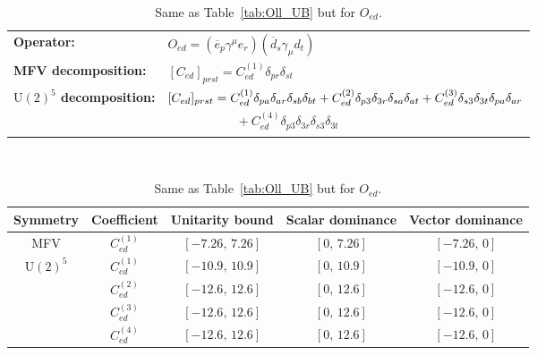 \begin{table}[tbp]
\centering
{\small
\begin{tabular}{ll}
    \textbf{Operator:} &
        $\boxed{O_{ed} = (\overline e_p \gamma^\mu e_r)(\overline d_s \gamma_\mu d_t)}$ \\[0.2cm]
    \textbf{MFV decomposition:} &
        $[C_{ed}]_{prst} =
            C_{ed}^{(1)}\delta_{pr}\delta_{st}$ \\[0.15cm]
    \textbf{$\mathrm{U}(2)^5$ decomposition:} &
        $[C_{ed}]_{prst} =
            C_{ed}^{(1)}\Pij{p}{r}{a}\Pij{s}{t}{b}
            + C_{ed}^{(2)}\delta_{p3}\delta_{3r}\Pij{s}{t}{a} + C_{ed}^{(3)}\delta_{s3}\delta_{3t}\Pij{p}{r}{a}
            $ \\
        & $\phantom{[C_{ed}]_{prst} ={}}+ C_{ed}^{(4)}\delta_{p3}\delta_{3r}\delta_{s3}\delta_{3t}$ \\
\end{tabular}
\\[0.3cm]
\renewcommand{\arraystretch}{1.3}
\begin{tabular}{ccccc}
    \toprule
    \rowcolor{hdrcolor}
    \textbf{Symmetry} & \textbf{Coefficient}
        & \textbf{Unitarity bound}
        & \textbf{Scalar dominance}
        & \textbf{Vector dominance} \\
    \midrule
    \multirow{1}{*}{MFV}
        & $C_{ed}^{(1)}$ & $[-7.26,\, 7.26]$  & $[0,\, 7.26]$      & $[-7.26,\, 0]$    \\
    \midrule
    \multirow{4}{*}{$\mathrm{U}(2)^5$}
        & $C_{ed}^{(1)}$ & $[-10.9,\, 10.9]$  & $[0,\, 10.9]$      & $[-10.9,\, 0]$    \\
        & $C_{ed}^{(2)}$ & $[-12.6,\, 12.6]$  & $[0,\, 12.6]$  & $[-12.6,\, 0]$ \\
        & $C_{ed}^{(3)}$ & $[-12.6,\, 12.6]$  & $[0,\, 12.6]$  & $[-12.6,\, 0]$ \\
        & $C_{ed}^{(4)}$ & $[-12.6,\, 12.6]$  & $[0,\, 12.6]$  & $[-12.6,\, 0]$ \\
    \bottomrule
\end{tabular}}
\caption{Same as Table~\ref{tab:Oll_UB} but for $O_{ed}$.}
\label{tab:Oed_UB}
\end{table}

